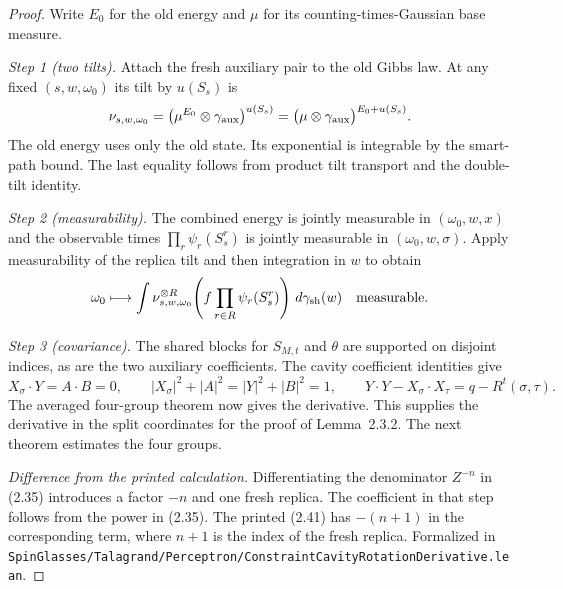 \begin{proof}
  \leanok
Write $E_0$ for the old energy and $\mu$ for its counting-times-Gaussian base measure.

\emph{Step 1 (two tilts).} Attach the fresh auxiliary pair to the old Gibbs law. At any fixed
$(s,w,\omega_0)$ its tilt by $u(S_s)$ is
\[
 \nu_{s,w,\omega_0}
 =\bigl(\mu^{E_0}\otimes\gamma_{\rm aux}\bigr)^{u(S_s)}
 =\bigl(\mu\otimes\gamma_{\rm aux}\bigr)^{E_0+u(S_s)} .
\]
The old energy uses only the old state. Its exponential is integrable by the smart-path bound.
The last equality follows from product tilt transport and the double-tilt identity.

\emph{Step 2 (measurability).} The combined energy is jointly measurable in $(\omega_0,w,x)$
and the observable times $\prod_r\psi_r(S_s^r)$ is jointly measurable in $(\omega_0,w,\sigma)$.
Apply measurability of the replica tilt and then integration in $w$ to obtain
\[
 \omega_0\longmapsto
 \int \nu_{s,w,\omega_0}^{\otimes R}\!
 \left(f\prod_{r\in R}\psi_r(S_s^r)\right)\,d\gamma_{\rm sh}(w)
 \quad\text{measurable.}
\]

\emph{Step 3 (covariance).} The shared blocks for $S_{M,t}$ and $\theta$ are supported on
disjoint indices, as are the two auxiliary coefficients. The cavity coefficient identities give
\[
 X_\sigma\cdot Y=A\cdot B=0,\qquad
 |X_\sigma|^2+|A|^2=|Y|^2+|B|^2=1,\qquad
 Y\cdot Y-X_\sigma\cdot X_\tau=q-R^t(\sigma,\tau).
\]
The averaged four-group theorem now gives the derivative. This supplies the derivative in the
split coordinates for the proof of Lemma~2.3.2. The next theorem estimates the four groups.

\emph{Difference from the printed calculation.} Differentiating the denominator $Z^{-n}$ in
(2.35) introduces a factor $-n$ and one fresh replica. The coefficient in that step follows
from the power in (2.35). The printed (2.41) has $-(n+1)$ in the corresponding term, where
$n+1$ is the index of the fresh replica.
Formalized in \texttt{SpinGlasses/Talagrand/Perceptron/ConstraintCavityRotationDerivative.lean}.
\end{proof}

